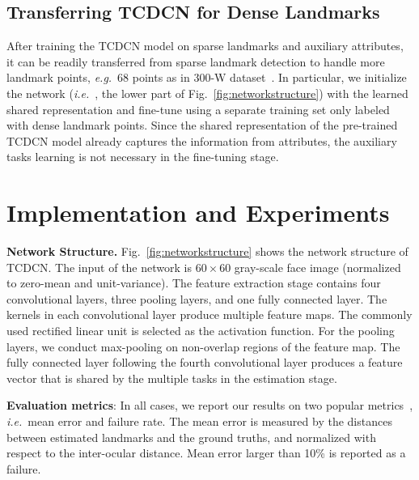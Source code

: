\documentclass[10pt,journal,compsoc]{IEEEtran}
\newcommand{\eg}{\emph{e.g.}}
\newcommand{\ie}{\emph{i.e.}~}
\begin{document}
\subsection{Transferring TCDCN for Dense Landmarks}
\label{sec:300w}
 After training the TCDCN model on sparse landmarks and auxiliary attributes, it can be readily transferred from sparse landmark detection to handle more landmark points, \eg~68 points as in 300-W dataset~\cite{300w}. In particular, we initialize the network (\ie, the lower part of Fig.~\ref{fig:networkstructure}) with the learned shared representation and fine-tune using a separate training set only labeled with dense landmark points. Since the shared representation of the pre-trained TCDCN model already captures the information from attributes, the auxiliary tasks learning is not necessary in the fine-tuning stage.

\section{Implementation and Experiments}

\label{sec:experiments}
\textbf{Network Structure.} Fig.~\ref{fig:networkstructure} shows the network structure of TCDCN. The input of the network is $60\times60$ gray-scale face image (normalized to zero-mean and unit-variance). The feature extraction stage contains four convolutional layers, three pooling layers, and one fully connected layer. The kernels in each convolutional layer produce multiple feature maps. The commonly used rectified linear unit is selected as the activation function. For the pooling layers, we conduct max-pooling on non-overlap regions of the feature map. The fully connected layer following the fourth convolutional layer produces a feature vector that is shared by the multiple tasks in the estimation stage.




\noindent\textbf{Evaluation metrics}:
In all cases, we report our results on two popular metrics~\cite{dollar13,Cao2012,Dantone2012,Sun2013}, \ie mean error and failure rate. The mean error is measured by the distances between estimated landmarks and the ground truths, and normalized with respect to the inter-ocular distance. Mean error larger than 10\% is reported as a failure.
\end{document}
